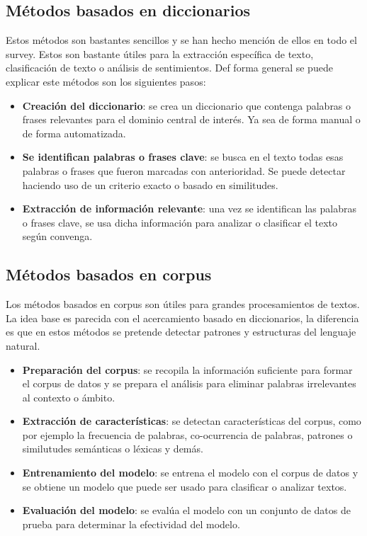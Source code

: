 \documentclass[12pt, conference]{IEEEtran}
\begin{document}
\subsection{Métodos basados en diccionarios}
Estos métodos son bastantes sencillos y se han hecho mención de ellos en todo el survey. Estos son bastante útiles para la extracción específica de texto, clasificación de texto o análisis de sentimientos. Def forma general se puede explicar este métodos son los siguientes pasos:

\begin{itemize}
  \item \textbf{Creación del diccionario}: se crea un diccionario que contenga palabras o frases relevantes para el dominio central de interés. Ya sea de forma manual o de forma automatizada.
  \item \textbf{Se identifican palabras o frases clave}: se busca en el texto todas esas palabras o frases que fueron marcadas con anterioridad. Se puede detectar haciendo uso de un criterio exacto o basado en similitudes.
  \item \textbf{Extracción de información relevante}: una vez se identifican las palabras o frases clave, se usa dicha información para analizar o clasificar el texto según convenga.
\end{itemize}

\subsection{Métodos basados en corpus}

Los métodos basados en corpus son útiles para grandes procesamientos de textos. La idea base es parecida con el acercamiento basado en diccionarios, la diferencia es que en estos métodos se pretende detectar patrones y estructuras del lenguaje natural.

\begin{itemize}
  \item \textbf{Preparación del corpus}: se recopila la información suficiente para formar el corpus de datos y se prepara el análisis para eliminar palabras irrelevantes al contexto o ámbito.
  \item \textbf{Extracción de características}: se detectan características del corpus, como por ejemplo la frecuencia de palabras, co-ocurrencia de palabras, patrones o similutudes semánticas o léxicas y demás.
  \item \textbf{Entrenamiento del modelo}: se entrena el modelo con el corpus de datos y se obtiene un modelo que puede ser usado para clasificar o analizar textos.
  \item \textbf{Evaluación del modelo}: se evalúa el modelo con un conjunto de datos de prueba para determinar la efectividad del modelo.
\end {itemize}
\end{document}
